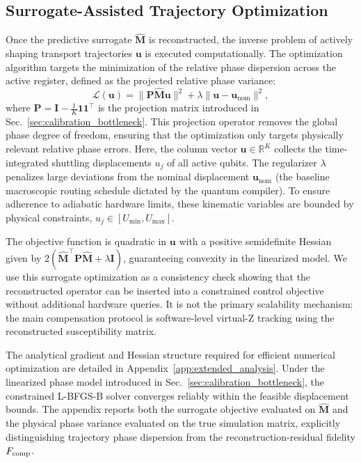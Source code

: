 \documentclass[a4paper,twocolumn,11pt]{quantumarticle}
\begin{document}
\subsection{Surrogate-Assisted Trajectory Optimization}
\label{sec:trajectory_optimization}

Once the predictive surrogate $\hat{\mathbf{M}}$ is reconstructed, the inverse problem of actively shaping transport trajectories $\mathbf{u}$ is executed computationally. The optimization algorithm targets the minimization of the relative phase dispersion across the active register, defined as the projected relative phase variance:
\begin{equation}
    \mathcal{L}(\mathbf{u}) = \|\mathbf{P} \hat{\mathbf{M}} \mathbf{u}\|^2 + \lambda \|\mathbf{u} - \mathbf{u}_{\text{nom}}\|^2,
\end{equation}
where $\mathbf{P} = \mathbf{I} - \frac{1}{K}\mathbf{1}\mathbf{1}^\top$ is the projection matrix introduced in Sec.~\ref{sec:calibration_bottleneck}. This projection operator removes the global phase degree of freedom, ensuring that the optimization only targets physically relevant relative phase errors.
Here, the column vector $\mathbf{u} \in \mathbb{R}^K$ collects the time-integrated shuttling displacements $u_j$ of all active qubits. The regularizer $\lambda$ penalizes large deviations from the nominal displacement $\mathbf{u}_{\text{nom}}$ (the baseline macroscopic routing schedule dictated by the quantum compiler). To ensure adherence to adiabatic hardware limits, these kinematic variables are bounded by physical constraints, $u_j \in [U_{\min}, U_{\max}]$.

The objective function is quadratic in $\mathbf{u}$ with a positive semidefinite Hessian given by $2(\hat{\mathbf{M}}^\top \mathbf{P} \hat{\mathbf{M}} + \lambda \mathbf{I})$, guaranteeing convexity in the linearized model. We use this surrogate optimization as a consistency check showing that the reconstructed operator can be inserted into a constrained control objective without additional hardware queries. It is not the primary scalability mechanism: the main compensation protocol is software-level virtual-Z tracking using the reconstructed susceptibility matrix.

The analytical gradient and Hessian structure required for efficient numerical optimization are detailed in Appendix~\ref{app:extended_analysis}. Under the linearized phase model introduced in Sec.~\ref{sec:calibration_bottleneck}, the constrained L-BFGS-B solver converges reliably within the feasible displacement bounds. The appendix reports both the surrogate objective evaluated on $\hat{\mathbf{M}}$ and the physical phase variance evaluated on the true simulation matrix, explicitly distinguishing trajectory phase dispersion from the reconstruction-residual fidelity $F_{\rm comp}$.
\end{document}
